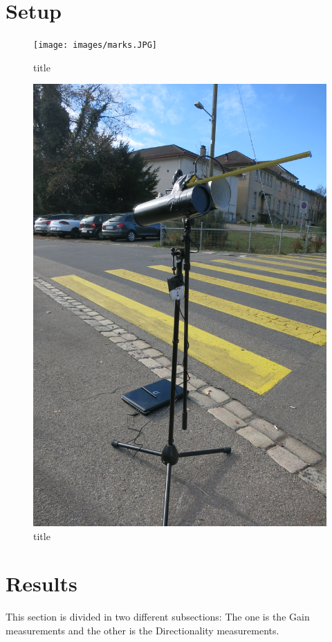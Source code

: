 \documentclass[12pt,a4paper]{article}
\begin{document}
\section{Setup}
	\begin{figure}
		\texttt{[image: images/marks.JPG]}
		\caption{title}
		\label{marks}
	\end{figure}
	\begin{figure}
		\includegraphics[angle=270,width=\textwidth]{images/setup.JPG}
		\caption{title}
		\label{setup}
	\end{figure}

\section{Results}
This section is divided in two different subsections: The one is the Gain measurements and the other is the Directionality measurements. 
\end{document}
